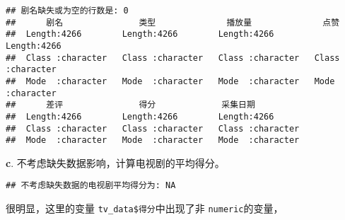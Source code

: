 \documentclass[
]{article}
\newenvironment{Shaded}{\begin{snugshade}}{\end{snugshade}}
\newcommand{\AttributeTok}[1]{\textcolor[rgb]{0.13,0.29,0.53}{#1}}
\newcommand{\CommentTok}[1]{\textcolor[rgb]{0.56,0.35,0.01}{\textit{#1}}}
\newcommand{\ConstantTok}[1]{\textcolor[rgb]{0.56,0.35,0.01}{#1}}
\newcommand{\FunctionTok}[1]{\textcolor[rgb]{0.13,0.29,0.53}{\textbf{#1}}}
\newcommand{\NormalTok}[1]{#1}
\newcommand{\OtherTok}[1]{\textcolor[rgb]{0.56,0.35,0.01}{#1}}
\newcommand{\SpecialCharTok}[1]{\textcolor[rgb]{0.81,0.36,0.00}{\textbf{#1}}}
\newcommand{\StringTok}[1]{\textcolor[rgb]{0.31,0.60,0.02}{#1}}
\begin{document}
\begin{verbatim}
## 剧名缺失或为空的行数是: 0 
##      剧名               类型              播放量              点赞          
##  Length:4266        Length:4266        Length:4266        Length:4266       
##  Class :character   Class :character   Class :character   Class :character  
##  Mode  :character   Mode  :character   Mode  :character   Mode  :character  
##      差评               得分             采集日期        
##  Length:4266        Length:4266        Length:4266       
##  Class :character   Class :character   Class :character  
##  Mode  :character   Mode  :character   Mode  :character
\end{verbatim}

\textbf{c}. 不考虑缺失数据影响，计算电视剧的平均得分。

\begin{Shaded}
\end{Shaded}

\begin{verbatim}
## 不考虑缺失数据的电视剧平均得分为: NA
\end{verbatim}

很明显，这里的变量 \texttt{tv\_data\$得分}中出现了非
\texttt{numeric}的变量，

\begin{Shaded}
\end{Shaded}
\end{document}
